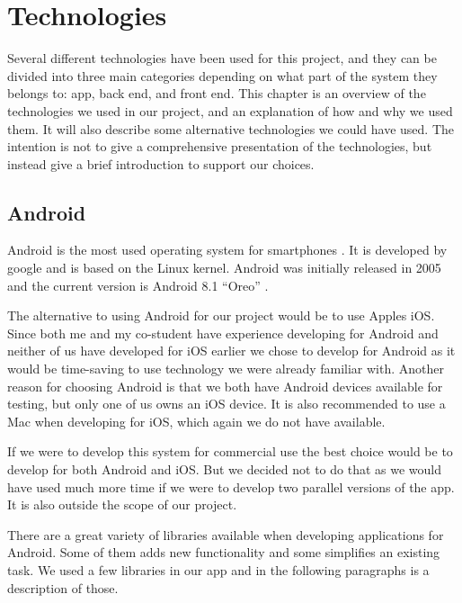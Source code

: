 \documentclass[../Main/thesis.tex]{subfiles}
\begin{document}
\chapter{Technologies}
\label{ch:technologies}

Several different technologies have been used for this project, and they can be divided into three main categories depending on what part of the system they belongs to: app, back end, and front end.
This chapter is an overview of the technologies we used in our project, and an explanation of how and why we used them.
It will also describe some alternative technologies we could have used.
The intention is not to give a comprehensive presentation of the technologies, but instead give a brief introduction to support our choices.

\section{Android}
Android is the most used operating system for smartphones \citep{osmarketshare}. 
It is developed by google and is based on the Linux kernel.
Android was initially released in 2005 \citep{Morrill2008a} and the current version is Android 8.1 ``Oreo'' \citep{Burke2017a}.

The alternative to using Android for our project would be to use Apples iOS.
Since both me and my co-student have experience developing for Android and neither of us have developed for iOS earlier we chose to develop for Android as it would be time-saving to use technology we were already familiar with.
Another reason for choosing Android is that we both have Android devices available for testing, but only one of us owns an iOS device.
It is also recommended to use a Mac when developing for iOS, which again we do not have available.

If we were to develop this system for commercial use the best choice would be to develop for both Android and iOS.
But we decided not to do that as we would have used much more time if we were to develop two parallel versions of the app.
It is also outside the scope of our project.

There are a great variety of libraries available when developing applications for Android.
Some of them adds new functionality and some simplifies an existing task.
We used a few libraries in our app and in the following paragraphs is a description of those. %
\end{document}
